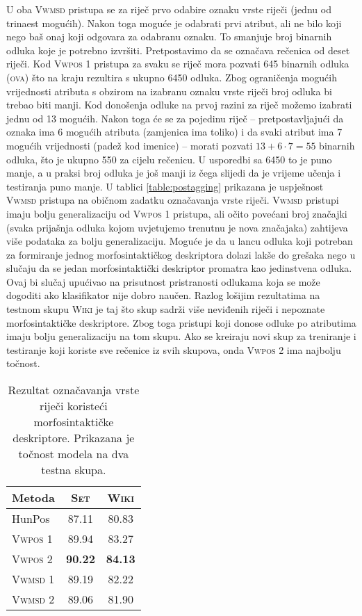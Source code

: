 U oba \textsc{Vwmsd} pristupa se za riječ prvo odabire oznaku vrste riječi
(jednu od trinaest mogućih). Nakon toga moguće je odabrati prvi atribut, ali ne
bilo koji nego baš onaj koji odgovara za odabranu oznaku. To smanjuje broj
binarnih odluka koje je potrebno izvršiti. Pretpostavimo da se označava rečenica
od deset riječi. Kod \textsc{Vwpos 1} pristupa za svaku se riječ mora pozvati
645 binarnih odluka (\textsc{ova}) što na kraju rezultira s ukupno 6450 odluka.
Zbog ograničenja mogućih vrijednosti atributa s obzirom na izabranu oznaku vrste
riječi broj odluka bi trebao biti manji. Kod donošenja odluke na prvoj razini za
riječ možemo izabrati jednu od 13 mogućih. Nakon toga će se za pojedinu riječ --
pretpostavljajući da oznaka ima 6 mogućih atributa (zamjenica ima toliko) i da
svaki atribut ima 7 mogućih vrijednosti (padež kod imenice) -- morati pozvati
$13+6 \cdot 7 = 55$ binarnih odluka, što je ukupno 550 za cijelu rečenicu. U
usporedbi sa 6450 to je puno manje, a u praksi broj odluka je još manji iz čega
slijedi da je vrijeme učenja i testiranja puno manje. U tablici
\ref{table:postagging} prikazana je uspješnost \textsc{Vwmsd} pristupa na
običnom zadatku označavanja vrste riječi. \textsc{Vwmsd} pristupi imaju bolju
generalizaciju od \textsc{Vwpos 1} pristupa, ali očito povećani broj značajki
(svaka prijašnja odluka kojom uvjetujemo trenutnu je nova značajaka) zahtijeva
više podataka za bolju generalizaciju. Moguće je da u lancu odluka koji potreban
za formiranje jednog morfosintaktičkog deskriptora dolazi lakše do grešaka nego
u slučaju da se jedan morfosintaktički deskriptor promatra kao jedinstvena
odluka. Ovaj bi slučaj upućivao na prisutnost pristranosti odlukama koja se može
dogoditi ako klasifikator nije dobro naučen. Razlog lošijim rezultatima na
testnom skupu \textsc{Wiki} je taj što skup sadrži više neviđenih riječi i
nepoznate morfosintaktičke deskriptore. Zbog toga pristupi koji donose odluke po
atributima imaju bolju generalizaciju na tom skupu. Ako se kreiraju novi skup za
treniranje i testiranje koji koriste sve rečenice iz svih skupova, onda
\textsc{Vwpos 2} ima najbolju točnost.

\begin{table}
\centering
\caption[Rezultat označavanja vrste riječi koristeći morfosintaktičke
deskriptore.]{Rezultat označavanja vrste riječi koristeći morfosintaktičke
deskriptore. Prikazana je točnost modela na dva testna skupa.}
\label{table:msdtagging}
\begin{tabular}{|l|c|c|}
\hline
Metoda             & \textsc{Set}   & \textsc{Wiki}  \\ \hline \hline
HunPos             & 87.11          & 80.83          \\
\textsc{Vwpos 1}   & 89.94          & 83.27          \\
\textsc{Vwpos 2}   & \textbf{90.22} & \textbf{84.13} \\
\textsc{Vwmsd 1}   & 89.19          & 82.22          \\
\textsc{Vwmsd 2}   & 89.06          & 81.90          \\ \hline
\end{tabular}
\end{table}
